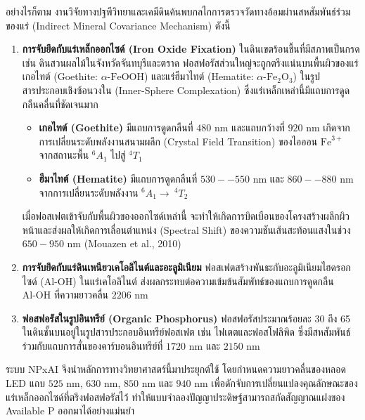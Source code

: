 \documentclass[12pt,a4paper,oneside]{book}
\begin{document}
อย่างไรก็ตาม งานวิจัยทางปฐพีวิทยาและเคมีดินค้นพบกลไกการตรวจวัดทางอ้อมผ่านสหสัมพันธ์ร่วมของแร่ (Indirect Mineral Covariance Mechanism) ดังนี้

\begin{enumerate}
    \item \textbf{การจับยึดกับแร่เหล็กออกไซด์ (Iron Oxide Fixation)}
    ในดินเขตร้อนชื้นที่มีสภาพเป็นกรด เช่น ดินสวนผลไม้ในจังหวัดจันทบุรีและตราด ฟอสฟอรัสส่วนใหญ่จะถูกตรึงแน่นบนพื้นผิวของแร่เกอไทต์ (Goethite: $\alpha\text{-FeOOH}$) และแร่ฮีมาไทต์ (Hematite: $\alpha\text{-Fe}_2\text{O}_3$) ในรูปสารประกอบเชิงซ้อนวงใน (Inner-Sphere Complexation) ซึ่งแร่เหล็กเหล่านี้มีแถบการดูดกลืนคลื่นที่ชัดเจนมาก
    \begin{itemize}
        \item \textbf{เกอไทต์ (Goethite)} มีแถบการดูดกลืนที่ $480\text{ nm}$ และแถบกว้างที่ $920\text{ nm}$ เกิดจากการเปลี่ยนระดับพลังงานสนามผลึก (Crystal Field Transition) ของไอออน $\text{Fe}^{3+}$ จากสถานะพื้น $^6A_1$ ไปสู่ $^4T_1$
        \item \textbf{ฮีมาไทต์ (Hematite)} มีแถบการดูดกลืนที่ $530--550\text{ nm}$ และ $860--880\text{ nm}$ จากการเปลี่ยนระดับพลังงาน $^6A_1 \rightarrow\ ^4T_2$
    \end{itemize}
    เมื่อฟอสเฟตเข้าจับกับพื้นผิวของออกไซด์เหล่านี้ จะทำให้เกิดการบิดเบือนของโครงสร้างผลึกผิวหน้าและส่งผลให้เกิดการเลื่อนตำแหน่ง (Spectral Shift) ของความชันเส้นสะท้อนแสงในช่วง $650 - 950\text{ nm}$ (Mouazen et al., 2010)
    
    \item \textbf{การจับยึดกับแร่ดินเหนียวเคโอลิไนต์และอะลูมิเนียม}
    ฟอสเฟตสร้างพันธะกับอะลูมิเนียมไฮดรอกไซด์ ($\text{Al-OH}$) ในแร่เคโอลิไนต์ ส่งผลกระทบต่อความเข้มข้นสัมพัทธ์ของแถบการดูดกลืน $\text{Al-OH}$ ที่ความยาวคลื่น $2206\text{ nm}$
    
    \item \textbf{ฟอสฟอรัสในรูปอินทรีย์ (Organic Phosphorus)}
    ฟอสฟอรัสประมาณร้อยละ 30 ถึง 65 ในดินชั้นบนอยู่ในรูปสารประกอบอินทรีย์ฟอสเฟต เช่น ไฟเตตและฟอสโฟลิพิด ซึ่งมีสหสัมพันธ์ร่วมกับแถบการสั่นของคาร์บอนอินทรีย์ที่ $1720\text{ nm}$ และ $2150\text{ nm}$
\end{enumerate}

ระบบ NPxAI จึงนำหลักการทางวิทยาศาสตร์นี้มาประยุกต์ใช้ โดยกำหนดความยาวคลื่นของหลอด LED แถบ $525\text{ nm}$, $630\text{ nm}$, $850\text{ nm}$ และ $940\text{ nm}$ เพื่อดักจับการเปลี่ยนแปลงคุณลักษณะของแร่เหล็กออกไซด์ที่ตรึงฟอสฟอรัสไว้ ทำให้แบบจำลองปัญญาประดิษฐ์สามารถสกัดสัญญาณแฝงของ Available P ออกมาได้อย่างแม่นยำ
\end{document}
